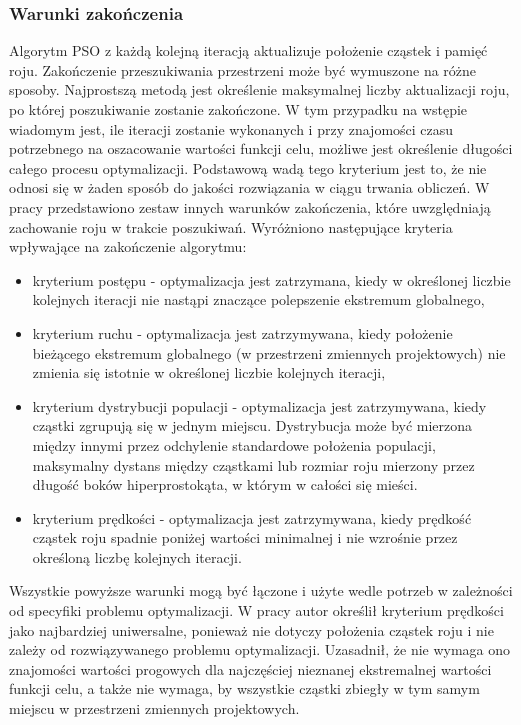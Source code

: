 \subsubsection{Warunki zakończenia}
Algorytm PSO z każdą kolejną iteracją aktualizuje położenie cząstek i pamięć roju. Zakończenie przeszukiwania przestrzeni może być wymuszone na różne sposoby. Najprostszą metodą jest określenie maksymalnej liczby aktualizacji roju, po której poszukiwanie zostanie zakończone. W tym przypadku na wstępie wiadomym jest, ile iteracji zostanie wykonanych i przy znajomości czasu potrzebnego na oszacowanie wartości funkcji celu, możliwe jest określenie długości całego procesu optymalizacji. Podstawową wadą tego kryterium jest to, że nie odnosi się w żaden sposób do jakości rozwiązania w ciągu trwania obliczeń. W pracy \parencite{Zielinski2007} przedstawiono zestaw innych warunków zakończenia, które uwzględniają zachowanie roju w trakcie poszukiwań. Wyróżniono następujące kryteria wpływające na zakończenie algorytmu:
\begin{itemize}
	\item kryterium postępu - optymalizacja jest zatrzymana, kiedy w określonej liczbie kolejnych iteracji nie nastąpi znaczące polepszenie ekstremum globalnego,
	\item kryterium ruchu - optymalizacja jest zatrzymywana, kiedy położenie bieżącego ekstremum globalnego (w przestrzeni zmiennych projektowych) nie zmienia się istotnie w określonej liczbie kolejnych iteracji,
	\item kryterium dystrybucji populacji - optymalizacja jest zatrzymywana, kiedy cząstki zgrupują się w jednym miejscu. Dystrybucja może być mierzona między innymi przez odchylenie standardowe położenia populacji, maksymalny dystans między cząstkami lub rozmiar roju mierzony przez długość boków hiperprostokąta, w którym w całości się mieści.  
	\item kryterium prędkości - optymalizacja jest zatrzymywana, kiedy prędkość cząstek roju spadnie poniżej wartości minimalnej i nie wzrośnie przez określoną liczbę kolejnych iteracji. 
\end{itemize}
Wszystkie powyższe warunki mogą być łączone i użyte wedle potrzeb w zależności od specyfiki problemu optymalizacji. W pracy \cite{Banach2017} autor określił kryterium prędkości jako najbardziej uniwersalne, ponieważ nie dotyczy położenia cząstek roju i nie zależy od rozwiązywanego problemu optymalizacji. Uzasadnił, że nie wymaga ono znajomości wartości progowych dla najczęściej nieznanej ekstremalnej wartości funkcji celu, a także nie wymaga, by wszystkie cząstki zbiegły w tym samym miejscu w przestrzeni zmiennych projektowych.
